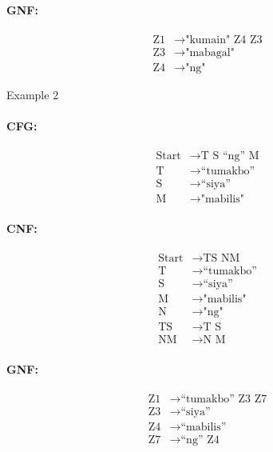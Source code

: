 \paragraph{GNF:}
\begin{equation*}
    \begin{aligned}
        \text{Z1}   & \rightarrow \text{"kumain" Z4 Z3}   \\
        \text{Z3} & \rightarrow \text{"mabagal"}   \\
        \text{Z4} & \rightarrow \text{"ng"}
    \end{aligned}
\end{equation*}

Example 2
\paragraph{CFG:}
\begin{equation*}
    \begin{aligned}
        \text{Start}   & \rightarrow \text{T S “ng” M}   \\
        \text{T} & \rightarrow \text{“tumakbo”}   \\
        \text{S} & \rightarrow \text{“siya”} \\
        \text{M} & \rightarrow \text{"mabilis"}
    \end{aligned}
\end{equation*}

\paragraph{CNF:}
\begin{equation*}
    \begin{aligned}
        \text{Start}   & \rightarrow \text{TS NM}   \\
        \text{T} & \rightarrow \text{“tumakbo”}   \\
        \text{S} & \rightarrow \text{“siya”} \\
        \text{M} & \rightarrow \text{"mabilis"} \\
        \text{N} & \rightarrow \text{"ng"} \\
        \text{TS} & \rightarrow \text{T S} \\
        \text{NM} & \rightarrow \text{N M}
    \end{aligned}
\end{equation*}

\paragraph{GNF:}
\begin{equation*}
    \begin{aligned}
        \text{Z1}   & \rightarrow \text{“tumakbo” Z3 Z7}   \\
        \text{Z3} & \rightarrow \text{“siya”}   \\
        \text{Z4} & \rightarrow \text{“mabilis”} \\
        \text{Z7} & \rightarrow \text{“ng” Z4}
    \end{aligned}
\end{equation*}

